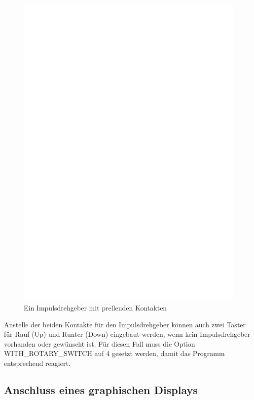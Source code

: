 \begin{figure}[H]
\centering
\includegraphics[width=14cm]{../FIG/rotary_bouncing.eps}
\caption{Ein Impulsdrehgeber mit prellenden Kontakten}
\label{fig:RotBounce}
\end{figure}

Anstelle der beiden Kontakte für den Impulsdrehgeber können auch zwei Taster für Rauf (Up) und Runter (Down)
eingebaut werden, wenn kein Impulsdrehgeber vorhanden oder gewünscht ist.
Für diesen Fall muss die Option WITH\_ROTARY\_SWITCH auf 4 gesetzt werden, damit das Programm
entsprechend reagiert.

\subsection{Anschluss eines graphischen Displays}

